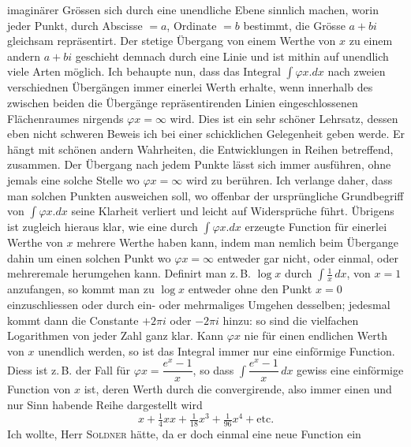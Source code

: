 %
imagin\"arer Gr\"ossen sich durch eine unendliche Ebene sinnlich machen, worin jeder Punkt, durch Abscisse $=a$, Ordinate $=b$ bestimmt, die Gr\"osse $a+bi$ gleichsam repr\"asentirt. Der stetige \"Ubergang von einem Werthe von $x$ zu einem andern $a+bi$ geschieht demnach durch eine Linie und ist mithin auf unendlich viele Arten m\"oglich. Ich behaupte nun, dass das Integral $\int \varphi x\mathord{.} dx$ nach zweien verschiednen \"Uberg\"angen immer einerlei Werth erhalte, wenn innerhalb des zwischen beiden die \"Uberg\"ange repr\"asentirenden Linien eingeschlossenen Fl\"achenraumes nirgends $\varphi x = \infty$ wird. Dies ist ein sehr sch\"oner Lehrsatz, dessen eben nicht schweren Beweis ich bei einer schicklichen Gelegenheit geben werde. Er h\"angt mit sch\"onen andern Wahrheiten, die Entwicklungen in Reihen betreffend, zusammen. Der \"Ubergang nach jedem Punkte l\"asst sich immer ausf\"uhren, ohne jemals eine solche Stelle wo $\varphi x=\infty$ wird zu ber\"uhren. Ich verlange daher, dass man solchen Punkten ausweichen soll, wo offenbar der urspr\"ungliche Grundbegriff von $\int \varphi x\mathord{.} dx$ seine Klarheit verliert und leicht auf Widerspr\"uche f\"uhrt. \"Ubrigens ist zugleich hieraus klar, wie eine durch $\int \varphi x\mathord{.} dx$ erzeugte Function f\"ur einerlei Werthe von $x$ mehrere Werthe haben kann, indem man nemlich beim \"Ubergange dahin um einen solchen Punkt wo $\varphi x=\infty$ entweder gar nicht, oder einmal, oder mehreremale herumgehen kann. Definirt man z.\,B. $\log x$ durch $\int \frac{1}{x}\,dx$, von $x=1$ anzufangen, so kommt man zu $\log x$ entweder ohne den Punkt $x=0$ einzuschliessen oder durch ein- oder mehrmaliges Umgehen desselben; jedesmal kommt dann die Constante $+2\pi i$ oder $-2\pi i$ hinzu: so sind die vielfachen Logarithmen von jeder Zahl ganz klar. Kann $\varphi x$ nie f\"ur einen endlichen Werth von $x$ unendlich werden, so ist das Integral immer nur eine einf\"ormige Function. Diess ist z.\,B. der Fall f\"ur $\varphi x = \dfrac{e^x-1}{x}$, so dass $\int \dfrac{e^x-1}{x}\,dx$ gewiss eine einf\"ormige Function von $x$ ist, deren Werth durch die  convergirende, also immer einen und nur  Sinn habende Reihe dargestellt wird
\[
x+\tfrac{1}{4}xx+\tfrac{1}{18}x^3+\tfrac{1}{96}x^4+\text{etc.}
\]
\noindent Ich wollte, Herr \textsc{Soldner} h\"atte, da er doch einmal eine neue Function ein%
